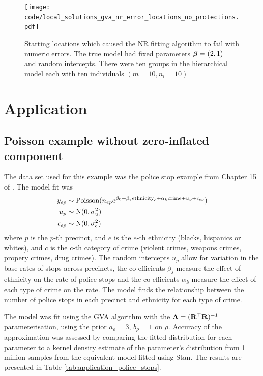 \documentclass{amsart}[12pt]
\begin{document}
			\begin{figure}
				\label{fig:stability_locations_nr}
				\caption{Starting locations which caused the NR fitting algorithm to fail with numeric errors. The true model 						had fixed parameters ${\boldsymbol \beta} = (2, 1)^\top$ and random intercepts. There were ten groups in the
					hierarchical model each	with ten individuals $(m=10, n_i=10)$}
				\texttt{[image: code/local\_solutions\_gva\_nr\_error\_locations\_no\_protections.pdf]}
			\end{figure}
			
			\section{Application}
			\label{sec:application}
			
			\subsection{Poisson example without zero-inflated component}
			The data set used for this example was the police stop example from Chapter 15 of \citep{Gelman2007}.
			The model fit was
			\begin{align*}
				y_{ep}        & \sim \text{Poisson}(n_{ep} e^{\beta_0 + \beta_e \text{ethnicity}_e + \alpha_{k} \text{crime} + u_p + \epsilon_{ep}}) \\
				u_p           & \sim \text{N}(0, \sigma_u^2)                                                                                               \\
				\epsilon_{ep} & \sim \text{N}(0, \sigma_\epsilon^2)                                                                                        
			\end{align*}
			where $p$ is the $p$-th precinct, and $e$ is the $e$-th ethnicity (blacks, hispanics or whites), and $c$ is
			the $c$-th category of crime (violent crimes, weapons crimes, propery crimes, drug crimes). The random 
			intercepts $u_p$ allow for variation in the base rates of stops across precincts,
			the co-efficients $\beta_j$ measure the effect of ethnicity on the rate of police stops and
			the co-efficients $\alpha_k$ measure the effect of each type of crime on the rate.
			The model finds the relationship between the number of police stops in each precinct and 
			ethnicity	for each type of crime.
			
			The model was fit using the GVA algorithm with the ${\boldsymbol \Lambda} = ({\bf R}^\top {\bf R})^{-1}$ parameterisation, using
			the prior $a_\rho = 3$, $b_\rho = 1$ on $\rho$. Accuracy of the approximation was assessed by comparing the
			fitted distribution for each parameter to a kernel density estimate of the parameter's distribution from
			1 million samples from the equivalent model fitted using Stan. The results are presented in Table
			\ref{tab:application_police_stops}.
			
\end{document}
